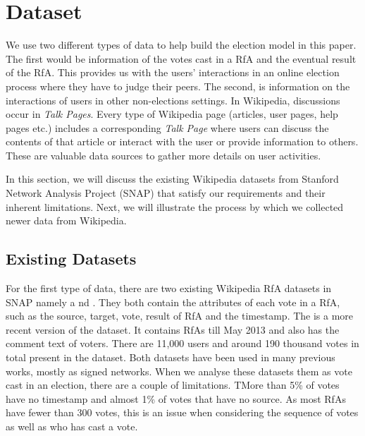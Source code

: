 \section{Dataset}
\label{sec:dataset}

We use two different types of data to help build the election model in this paper. The first would be information of the votes cast in a RfA and the eventual result of the RfA. This provides us with the users' interactions in an online election process where they have to judge their peers. The second, is information on the interactions of users in other non-elections settings. In Wikipedia, discussions occur in \textit{Talk Pages}. Every type of Wikipedia page (articles, user pages, help pages etc.) includes a corresponding \textit{Talk Page} where users can discuss the contents of that article or interact with the user or provide information to others. These are valuable data sources to gather more details on user activities.

In this section, we will discuss the existing Wikipedia datasets from Stanford Network Analysis Project (SNAP) \cite{snapnets} that satisfy our requirements and their inherent limitations. Next, we will illustrate the process by which we collected newer data from Wikipedia.


\subsection{Existing Datasets}
For the first type of data, there are two existing Wikipedia RfA datasets in SNAP namely \wikielect a
nd \wikirfa. They both contain the attributes of each vote in a RfA, such as the source, target, vote, result of RfA and the timestamp. The \wikirfa is a more recent version of the \wikielect dataset. It contains RfAs till May 2013 and also has the comment text of voters. There are 11,000 users and around 190 thousand votes in total present in the dataset. Both datasets have been used in many previous works, mostly as signed networks. When we analyse these datasets them as vote cast in an election, there are a couple of limitations. TMore than 5\% of \wikirfa votes have no timestamp and almost 1\% of votes that have no source. As most RfAs have fewer than 300 votes, this is an issue when considering the sequence of votes as well as who has cast a vote.


